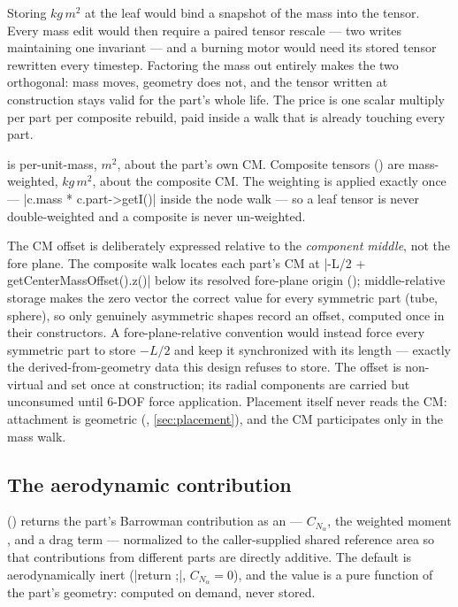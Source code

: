 \begin{rejected}
Storing $\unit{kg\,m^2}$ at the leaf would bind a snapshot of the mass into the tensor. Every mass
edit would then require a paired tensor rescale --- two writes maintaining one invariant --- and a
burning motor would need its stored tensor rewritten every timestep. Factoring the mass out
entirely makes the two orthogonal: mass moves, geometry does not, and the tensor written at
construction stays valid for the part's whole life. The price is one scalar multiply per part per
composite rebuild, paid inside a walk that is already touching every part.
\end{rejected}

\begin{keyinsight}
 is per-unit-mass, $\unit{m^2}$, about the part's own CM. Composite tensors
() are mass-weighted, $\unit{kg\,m^2}$, about the composite CM. The
weighting is applied exactly once --- \cppinline|c.mass * c.part->getI()| inside the node walk ---
so a leaf tensor is never double-weighted and a composite is never un-weighted.
\end{keyinsight}

The CM offset is deliberately expressed relative to the \emph{component middle}, not the fore
plane. The composite walk locates each part's CM at
\cppinline|-L/2 + getCenterMassOffset().z()| below its resolved fore-plane origin
(); middle-relative storage makes the zero vector the correct
value for every symmetric part (tube, sphere), so only genuinely asymmetric shapes record an
offset, computed once in their constructors. A fore-plane-relative convention would instead force
every symmetric part to store $-L/2$ and keep it synchronized with its length --- exactly the
derived-from-geometry data this design refuses to store. The offset is non-virtual and set once at
construction; its radial components are carried but unconsumed until 6-DOF force application.
Placement itself never reads the CM: attachment is geometric (,
\cref{sec:placement}), and the CM participates only in the mass walk.

\subsection{The aerodynamic contribution}\label{sec:leaf-aero}

 () returns the part's Barrowman contribution
as an  --- $C_{N_\alpha}$, the weighted moment , and a drag
term --- normalized to the caller-supplied shared reference area so that contributions from
different parts are directly additive. The default is aerodynamically inert
(\cppinline|return {};|, $C_{N_\alpha} = 0$), and the value is a pure function of the part's
geometry: computed on demand, never stored.

